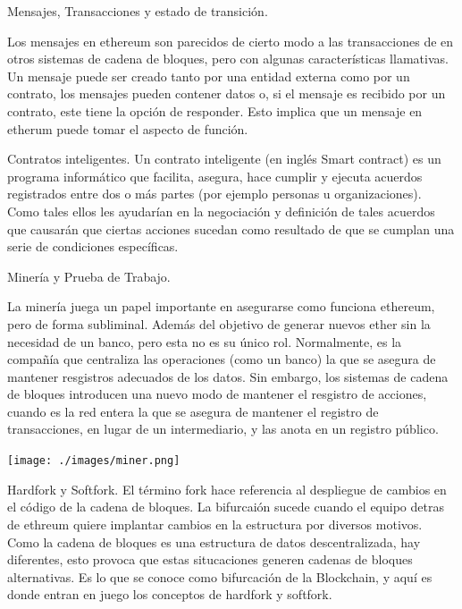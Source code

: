 \documentclass[usenames,dvipsnames]{beamer}
\begin{document}
\begin{frame}{ Mensajes, Transacciones y estado de transición. }

Los mensajes en ethereum son parecidos de cierto modo a las transacciones de en otros  sistemas de cadena de bloques, pero  con algunas características llamativas. Un mensaje puede ser creado tanto por una entidad externa como por un contrato, los mensajes pueden contener datos o, si el mensaje es recibido por un contrato, este tiene la opción de responder. Esto implica que un mensaje en etherum puede tomar el aspecto de función.\\
\end{frame}


\begin{frame}{ Contratos inteligentes. }
Un contrato inteligente (en inglés Smart contract) es un programa informático que facilita, asegura, hace cumplir y ejecuta acuerdos registrados entre dos o más partes (por ejemplo personas u organizaciones). Como tales ellos les ayudarían en la negociación y definición de tales acuerdos que causarán que ciertas acciones sucedan como resultado de que se cumplan una serie de condiciones específicas.\\
\end{frame}

\begin{frame}{ Minería y Prueba de Trabajo. }
	
La minería juega un papel importante en asegurarse como funciona ethereum, pero de forma subliminal. Además del objetivo de generar nuevos ether sin la necesidad de un banco, pero esta no es su único rol. Normalmente, es la compañía que centraliza las operaciones (como un banco) la que se asegura de mantener resgistros adecuados de los datos. Sin embargo, los sistemas de cadena de bloques introducen una nuevo modo de mantener el resgistro de acciones, cuando es la red entera la que se asegura de mantener el registro de transacciones, en lugar de un intermediario, y las anota en un registro público.\\
\begin{center}
\hfill\texttt{[image: ./images/miner.png]}
\end{center}
\end{frame}

\begin{frame}{ Hardfork y Softfork. }
El término fork hace referencia al despliegue de cambios en el código de la cadena de bloques. La bifurcaión sucede cuando el equipo detras de ethreum quiere implantar cambios en la estructura por diversos motivos. Como la cadena de bloques es una estructura de datos descentralizada, hay diferentes, esto provoca que estas situcaciones generen cadenas de bloques alternativas. Es lo que se conoce como bifurcación de la Blockchain, y aquí es donde entran en juego los conceptos de hardfork y softfork.\\
\end{frame}
\end{document}
